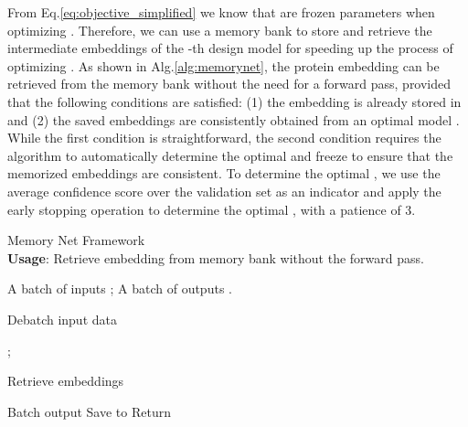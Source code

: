 \documentclass{article}
\newcommand\NoThen{\renewcommand\algorithmicthen{}}
\newcommand\NoDo{\renewcommand\algorithmicdo{}}
\begin{document}
\begin{minipage}{\linewidth}
    \begin{minipage}{0.5\linewidth}
        From Eq.\ref{eq:objective_simplified} we know that  are frozen parameters when optimizing . Therefore, we can use a memory bank  to store and retrieve the intermediate embeddings of the -th design model  for speeding up the process of optimizing . As shown in Alg.\ref{alg:memorynet}, the protein embedding  can be retrieved from the memory bank  without the need for a forward pass, provided that the following conditions are satisfied: (1) the embedding  is already stored in  and (2) the saved embeddings are consistently obtained from an optimal model . While the first condition is straightforward, the second condition requires the algorithm to automatically determine the optimal  and freeze  to ensure that the memorized embeddings are consistent. To determine the optimal , we use the average confidence score over the validation set as an indicator and apply the early stopping operation to determine the optimal , with a patience of 3. 
        

    \end{minipage}
    \hspace{0.00\linewidth}
    \begin{minipage}{0.5\linewidth}
        \begin{algorithm}[H]
            \caption{Memory Net Framework 
            \\\textbf{Usage}: Retrieve embedding from memory bank without the forward pass.}
            \label{alg:memorynet}
            \begin{small}
            \begin{algorithmic}[1]
                \Require A batch of inputs ; 
                \Ensure A batch of outputs .
                \NoDo
                \NoThen
        
                 Debatch input data
        
                \State ;
        
                \State
                
                 Retrieve embeddings

                \For{} 
                        \State 
                    \Else
                        \State 
                    \EndIf
                \EndFor
                \State
        
                 Batch output
                \State Save  to 
                \State Return 
            \end{algorithmic}
        \end{small}
        \end{algorithm}
    \end{minipage}
\end{minipage}
 
\end{document}
